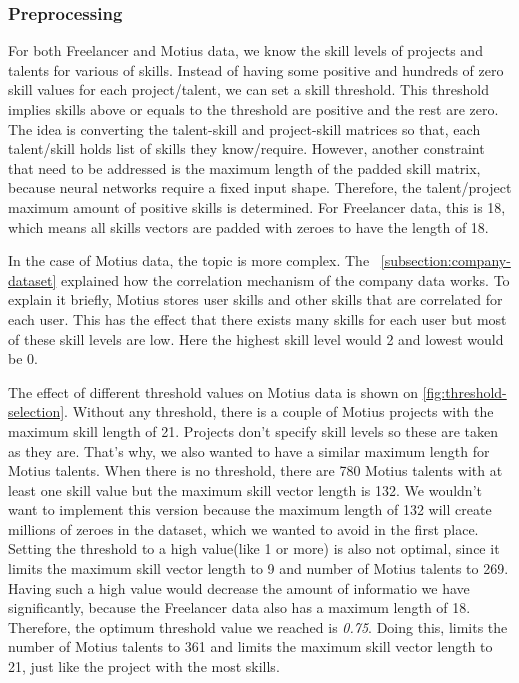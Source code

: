 \subsubsection{Preprocessing}

For both Freelancer and Motius data, we know the skill levels of projects and talents for various of skills. Instead of having some positive and hundreds of zero skill values for each project/talent, we can set a skill threshold. This threshold implies skills above or equals to the threshold are positive and the rest are zero. The idea is converting the talent-skill and project-skill matrices so that, each talent/skill holds list of skills they know/require. However, another constraint that need to be addressed is the maximum length of the padded skill matrix, because neural networks require a fixed input shape. Therefore, the talent/project maximum amount of positive skills is determined. For Freelancer data, this is 18, which means all skills vectors are padded with zeroes to have the length of 18. 

In the case of Motius data, the topic is more complex. The ~\autoref{subsection:company-dataset} explained how the correlation mechanism of the company data works. To explain it briefly, Motius stores user skills and other skills that are correlated for each user. This has the effect that there exists many skills for each user but most of these skill levels are low. Here the highest skill level would 2 and lowest would be 0.

The effect of different threshold values on Motius data is shown on \autoref{fig:threshold-selection}. Without any threshold, there is a couple of Motius projects with the maximum skill length of 21. Projects don't specify skill levels so these are taken as they are. That's why, we also wanted to have a similar maximum length for Motius talents. When there is no threshold, there are 780 Motius talents with at least one skill value but the maximum skill vector length is 132. We wouldn't want to implement this version because the maximum length of 132 will create millions of zeroes in the dataset, which we wanted to avoid in the first place. Setting the threshold to a high value(like 1 or more) is also not optimal, since it limits the maximum skill vector length to 9 and number of Motius talents to 269. Having such a high value would decrease the amount of informatio we have significantly,  because the Freelancer data also has a maximum length of 18. Therefore, the optimum threshold value we reached is \textit{0.75}. Doing this, limits the number of Motius talents to 361 and limits the maximum skill vector length to 21, just like the project with the most skills.





